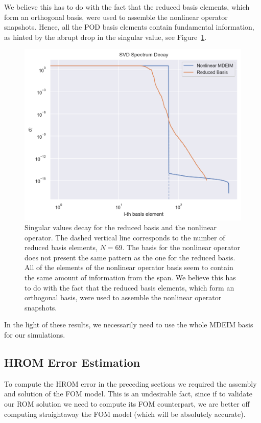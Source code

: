 \documentclass[../../thesis.tex]{subfiles}
\begin{document}
We believe this has to do with the fact that the reduced basis elements,
which form an orthogonal basis, were used to assemble the nonlinear operator snapshots.
Hence, all the POD basis elements contain fundamental information,
as hinted by the abrupt drop in the singular value, see Figure~\ref{fig:sigmas_decay}. 
\begin{figure}[h]
    \centering
    \includegraphics[width=1\columnwidth]{research_project/piston/figures/mdeim_certification/sigmas_problem.png}
    \caption{Singular values decay for the reduced basis and the nonlinear operator.
    The dashed vertical line corresponds to the number of reduced basis elements, $N=69$.
    The basis for the nonlinear operator does not present the same pattern as the 
    one for the reduced basis.
    All of the elements of the nonlinear operator basis 
    seem to contain the same amount of information from the span.
    We believe this has to do with the fact that the reduced basis elements,
    which form an orthogonal basis, were used to assemble the nonlinear operator snapshots.}
    \label{fig:sigmas_decay}
\end{figure}

In the light of these results, 
we necessarily need to use the whole MDEIM basis for our simulations.

\subsection{HROM Error Estimation}
\label{sec:hrom_results_posteriori_error_estimation}
To compute the HROM error in the preceding sections
we required the assembly and solution of the FOM model.
This is an undesirable fact, since if to validate our ROM solution
we need to compute its FOM counterpart, 
we are better off computing straightaway the FOM model 
(which will be absolutely accurate).
\end{document}
